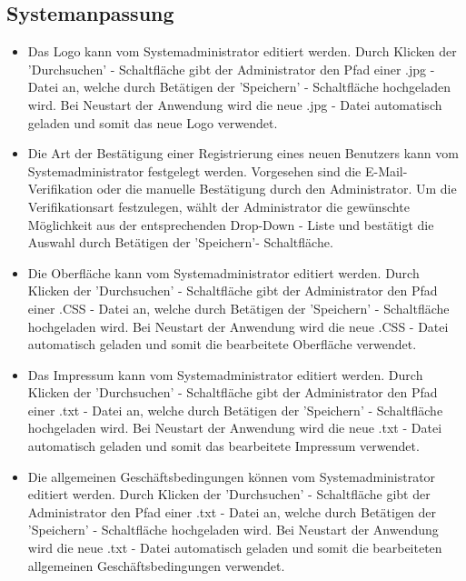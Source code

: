 \documentclass[a4paper]{scrreprt}
\begin{document}
\subsection{Systemanpassung}
\begin{itemize}
	\item {}
	Das Logo kann vom Systemadministrator editiert werden. Durch Klicken der 'Durchsuchen' - Schaltfläche gibt der Administrator den Pfad einer .jpg - Datei an, welche durch Betätigen der 'Speichern' - Schaltfläche hochgeladen wird. Bei Neustart der Anwendung wird die neue .jpg - Datei automatisch geladen und somit das neue Logo verwendet.
	\item {}
	Die Art der Bestätigung einer Registrierung eines neuen Benutzers kann vom Systemadministrator festgelegt werden.
	Vorgesehen sind die E-Mail-Verifikation oder die manuelle Bestätigung durch den Administrator. Um die Verifikationsart festzulegen, wählt der Administrator die gewünschte Möglichkeit aus der entsprechenden Drop-Down - Liste und bestätigt die Auswahl durch Betätigen der 'Speichern'- Schaltfläche.
	\item {}
	Die Oberfläche kann vom Systemadministrator editiert werden. Durch Klicken der 'Durchsuchen' - Schaltfläche gibt der Administrator den Pfad einer .CSS - Datei an, welche durch Betätigen der 'Speichern' - Schaltfläche hochgeladen wird. Bei Neustart der Anwendung wird die neue .CSS - Datei automatisch geladen und somit die bearbeitete Oberfläche verwendet.
	\item {}
	Das Impressum kann vom Systemadministrator editiert werden. Durch Klicken der 'Durchsuchen' - Schaltfläche gibt der Administrator den Pfad einer .txt - Datei an, welche durch Betätigen der 'Speichern' - Schaltfläche hochgeladen wird. Bei Neustart der Anwendung wird die neue .txt - Datei automatisch geladen und somit das bearbeitete Impressum verwendet.
	\item {}
	Die allgemeinen Geschäftsbedingungen können vom Systemadministrator editiert werden. Durch Klicken der 'Durchsuchen' - Schaltfläche gibt der Administrator den Pfad einer .txt - Datei an, welche durch Betätigen der 'Speichern' - Schaltfläche hochgeladen wird. Bei Neustart der Anwendung wird die neue .txt - Datei automatisch geladen und somit die bearbeiteten allgemeinen Geschäftsbedingungen verwendet.
\end{itemize}
		
\end{document}
